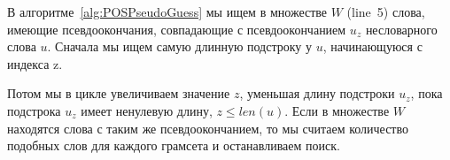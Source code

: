 В алгоритме~\ref{alg:POSPseudoGuess} 
мы ищем в множестве $W$ (line~5) слова, имеющие псевдоокончания, совпадающие с псевдоокончанием $u_z$ несловарного слова $u$. 
Сначала мы ищем самую длинную подстроку у $u$, начинающуюся с индекса z. 

Потом мы в цикле увеличиваем значение $z$, уменьшая длину подстроки $u_z$, пока 
подстрока $u_z$ имеет ненулевую длину, $z \leq len(u)$.
Если в множестве $W$ находятся слова с таким же псевдоокончанием, то мы считаем количество подобных слов для каждого грамсета и останавливаем поиск.
